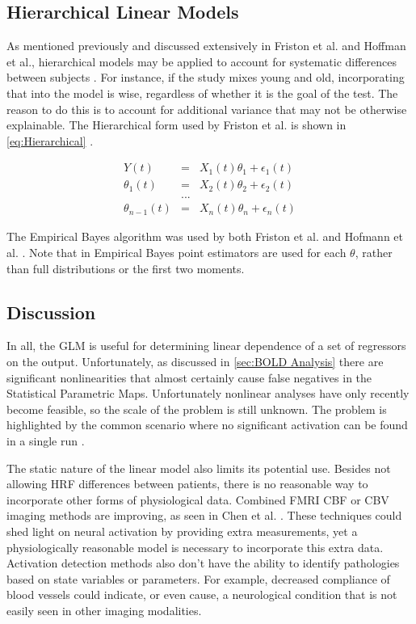 \subsection{Hierarchical Linear Models}
As mentioned previously and discussed extensively
in Friston et al. and Hoffman et al., hierarchical models may be 
applied to account for systematic differences between subjects
\cite{Friston2002, Hofmann1997}. For instance, if the
study mixes young and old, incorporating
that into the model is wise, regardless of whether it is the goal of the test. 
The reason to do this is to account for additional variance that may not
be otherwise explainable.  The Hierarchical form used by
Friston et al. is shown in \autoref{eq:Hierarchical} \cite{Friston2002}.

\begin{eqnarray}
\label{eq:Hierarchical}
Y(t) & = & X_1(t)\theta_1 + \epsilon_1(t)            \nonumber \\
\theta_1(t) &=& X_2(t)\theta_2 + \epsilon_2(t)     \nonumber \\
 & ... &                                             \nonumber \\
\theta_{n-1}(t)& =& X_n(t)\theta_n + \epsilon_n(t) 
\end{eqnarray}

The Empirical Bayes algorithm was used by both Friston et al. and Hofmann et al. 
\cite{Friston2002, Hofmann1997}. Note that in Empirical Bayes point estimators 
are used for each $\theta$, rather than full distributions or the first two moments.

\subsection{Discussion}
\label{sec:BackgroundConclusion}
In all, the GLM is useful for determining linear 
dependence of a set of regressors on the output. Unfortunately, as discussed in
\autoref{sec:BOLD Analysis} there are significant nonlinearities 
that almost certainly cause false negatives in the Statistical Parametric
Maps. Unfortunately nonlinear analyses have only recently become feasible,
so the scale of the problem is still unknown. The problem is 
highlighted by the common scenario where no significant
activation can be found in a single run \cite{Riera2004, Johnston2008}.  

The static nature of the  linear model also limits its potential use. 
Besides not allowing HRF differences between patients, there is no
reasonable way to incorporate other forms of physiological
data. Combined FMRI CBF or CBV imaging methods are improving,
as seen in Chen et al. \cite{Chen2009}. These techniques could shed light on
neural activation by providing extra measurements, yet a 
physiologically reasonable model is necessary to incorporate this extra data.
Activation detection methods also don't have the ability 
to identify pathologies based on state variables or parameters. For
example, decreased compliance of
blood vessels could indicate, or even cause, a neurological condition that 
is not easily seen in other imaging modalities. 

